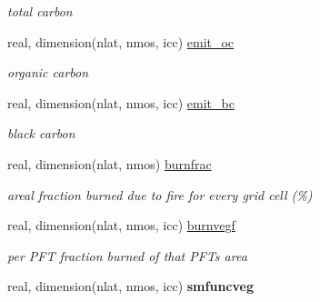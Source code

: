 \begin{DoxyCompactItemize}
\begin{DoxyCompactList}\small\item\em total carbon \end{DoxyCompactList}\item 
\hypertarget{structctem__statevars_1_1veg__rot_a24d350cab9025cdb95e51d14b841aec4}{}real, dimension(nlat, nmos, icc) \hyperlink{structctem__statevars_1_1veg__rot_a24d350cab9025cdb95e51d14b841aec4}{emit\+\_\+oc}\label{structctem__statevars_1_1veg__rot_a24d350cab9025cdb95e51d14b841aec4}

\begin{DoxyCompactList}\small\item\em organic carbon \end{DoxyCompactList}\item 
\hypertarget{structctem__statevars_1_1veg__rot_a76f8542281a53ef1b5bdacc5fa38e7c2}{}real, dimension(nlat, nmos, icc) \hyperlink{structctem__statevars_1_1veg__rot_a76f8542281a53ef1b5bdacc5fa38e7c2}{emit\+\_\+bc}\label{structctem__statevars_1_1veg__rot_a76f8542281a53ef1b5bdacc5fa38e7c2}

\begin{DoxyCompactList}\small\item\em black carbon \end{DoxyCompactList}\item 
\hypertarget{structctem__statevars_1_1veg__rot_a465bb4d03b3ca4babceef42fefb15d9a}{}real, dimension(nlat, nmos) \hyperlink{structctem__statevars_1_1veg__rot_a465bb4d03b3ca4babceef42fefb15d9a}{burnfrac}\label{structctem__statevars_1_1veg__rot_a465bb4d03b3ca4babceef42fefb15d9a}

\begin{DoxyCompactList}\small\item\em areal fraction burned due to fire for every grid cell (\%) \end{DoxyCompactList}\item 
\hypertarget{structctem__statevars_1_1veg__rot_acd245862e186fad320f4dce9a5b5bbce}{}real, dimension(nlat, nmos, icc) \hyperlink{structctem__statevars_1_1veg__rot_acd245862e186fad320f4dce9a5b5bbce}{burnvegf}\label{structctem__statevars_1_1veg__rot_acd245862e186fad320f4dce9a5b5bbce}

\begin{DoxyCompactList}\small\item\em per P\+F\+T fraction burned of that P\+F\+T\textquotesingle{}s area \end{DoxyCompactList}\item 
\hypertarget{structctem__statevars_1_1veg__rot_ab2ec7a5a0b42e1c7ebe4767541df416e}{}real, dimension(nlat, nmos, icc) {\bfseries smfuncveg}\label{structctem__statevars_1_1veg__rot_ab2ec7a5a0b42e1c7ebe4767541df416e}


\end{DoxyCompactItemize}
